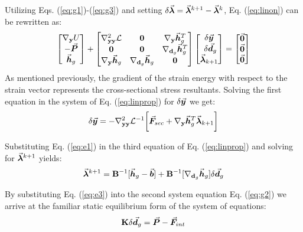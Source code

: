 \noindent Utilizing Eqs. (\ref{eq:g1})-(\ref{eq:g3}) and setting
$\delta{\vec{\bm{\lambda}}} = \vec{\bm{\lambda}}^{k+1} - \vec{\bm{\lambda}}^k$, Eq.
(\ref{eq:linon}) can be rewritten as:
\begin{gather}
	\begin{bmatrix}
		\nabla_{\mathbf{y}}U\\
		-\vec{\bm{P}}\\
		\vec{\bm{h}}_g
	\end{bmatrix} +
	\begin{bmatrix}
		\nabla^2_{\mathbf{yy}}\mathcal{L} & \mathbf{0} & 
		\nabla_{\mathbf{y}}\vec{\bm{h}}^T_g\\
		\mathbf{0} & \mathbf{0} & \nabla_{\mathbf{d}_g}\vec{\bm{h}}^T_g\\
		\nabla_{\mathbf{y}}\vec{\bm{h}}_g & \nabla_{\mathbf{d}_g}\vec{\bm{h}}_g & 
		\mathbf{0}\\
	\end{bmatrix}\begin{bmatrix}
		\delta\vec{\bm{y}} \\ {\ }\delta\vec{\bm{d}}_g \\ \vec{\bm{\lambda}}_{k+1}
	\end{bmatrix}
	= \begin{bmatrix}
		\vec{\bm{0}}\\ \vec{\bm{0}}\\ \vec{\bm{0}}
	\end{bmatrix}
	\label{eq:linprop}
\end{gather}
\noindent As mentioned previously, the gradient of the strain energy with
respect to the strain vector represents the cross-sectional
stress resultants. Solving the
first equation in the system of Eq. (\ref{eq:linprop}) for $\delta\vec{\bm{y}}$ we
get:
\begin{gather}
	\delta\vec{\bm{y}} =
	-\nabla^2_{\mathbf{yy}}\mathcal{L}^{-1}\bigg[\vec{\bm{F}}_{sec}
	+\nabla_{\mathbf{y}}\vec{\bm{h}}_g^T\vec{\bm{\lambda}}_{k+1}  \bigg]
	\label{eq:e1}
\end{gather}

\noindent Substituting Eq. (\ref{eq:e1}) in the third equation of Eq.
(\ref{eq:linprop}) and solving for $\vec{\bm{\lambda}}^{k+1}$ yields: %
\begin{gather}
	\vec{\bm{\lambda}}^{k+1} = \mathbf{B}^{-1}[\vec{\bm{h}}_g -
	\vec{\bm{b}}]+\mathbf{B}^{-1}[\nabla_{\mathbf{d}_g}\vec{\bm{h}}_g]\delta\vec{\bm{d}}_g
	\label{eq:e3}
\end{gather}

\noindent By substituting Eq. (\ref{eq:e3}) into the second system equation
Eq.  (\ref{eq:g2}) we arrive at the familiar static equilibrium form of
the system of equations: %
\begin{gather}
	\mathbf{K}\delta\vec{\bm{d}}_g = \vec{\bm{P}} - \vec{\bm{F}}_{int}
	\label{eq:stiffsys}
\end{gather}

